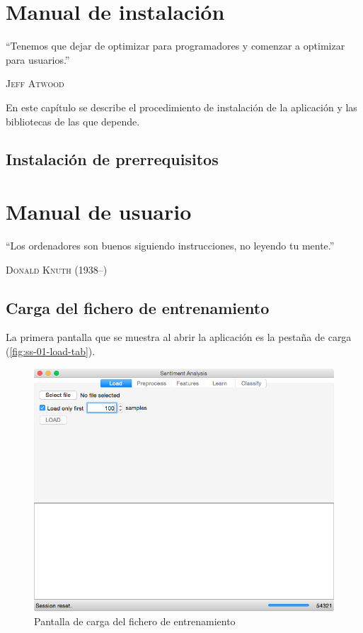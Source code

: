 
\chapter{Manual de instalación}

\epigraph{``Tenemos que dejar de optimizar para programadores y comenzar a optimizar para usuarios.''}{\textsc{Jeff Atwood}}

En este capítulo se describe el procedimiento de instalación de la aplicación y las bibliotecas de las que depende.

\section{Instalación de prerrequisitos}



\chapter{Manual de usuario}

\epigraph{``Los ordenadores son buenos siguiendo instrucciones, no leyendo tu mente.''}{\textsc{Donald Knuth} (1938--)}

\section{Carga del fichero de entrenamiento}

La primera pantalla que se muestra al abrir la aplicación es la pestaña de carga (\autoref{fig:ss-01-load-tab}).

\begin{figure}[H]
\centering
\includegraphics[width=13cm]{ss-01-load-tab}
\caption{Pantalla de carga del fichero de entrenamiento}
\label{fig:ss-01-load-tab}
\end{figure}

